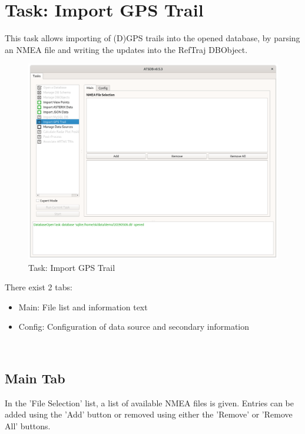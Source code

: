 \section{Task: Import GPS Trail}
\label{sec:task_import_gps} 

This task allows importing of (D)GPS trails into the opened database, by parsing an NMEA file and writing the updates into the RefTraj DBObject.

\begin{figure}[H]
  \hspace*{-2.5cm}
    \includegraphics[width=19cm]{figures/gps_import_task.png}
  \caption{Task: Import GPS Trail}
\end{figure}

There exist 2 tabs:

\begin{itemize}  
\item Main: File list and information text
\item Config: Configuration of data source and secondary information
\end{itemize}
\ \\

\subsection{Main Tab}

In the 'File Selection' list, a list of available NMEA files is given. Entries can be added using the 'Add' button or removed using either the 'Remove' or 'Remove All' buttons. \\


